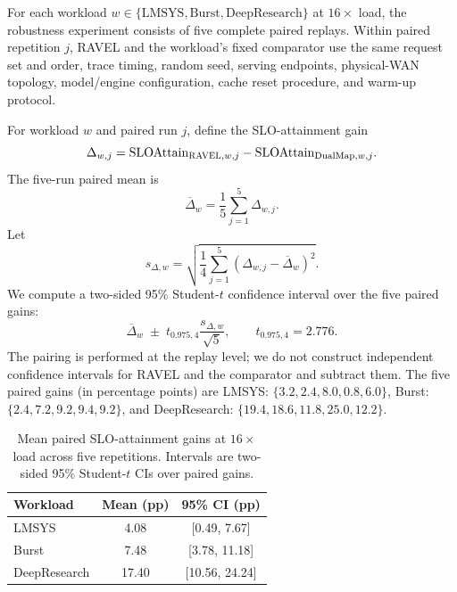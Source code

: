 \documentclass[letterpaper,twocolumn,10pt]{article}
\begin{document}
For each workload
$w\in\{\mathrm{LMSYS},\mathrm{Burst},\mathrm{DeepResearch}\}$ at
$16\times$ load, the robustness experiment consists of five complete paired
replays.  Within paired repetition $j$, RAVEL and the workload's fixed
comparator use the same request set and order, trace timing, random seed,
serving endpoints, physical-WAN topology, model/engine configuration, cache
reset procedure, and warm-up protocol.

For workload $w$ and paired run $j$, define the SLO-attainment gain
\begin{equation}
    \Delta_{w,j}
    =
    \mathrm{SLOAttain}_{\textsc{RAVEL},w,j}
    -
    \mathrm{SLOAttain}_{\mathrm{DualMap},w,j}.
    \label{eq:appendix:paired-gain}
\end{equation}
The five-run paired mean is
\begin{equation}
    \overline{\Delta}_w
    =
    \frac{1}{5}
    \sum_{j=1}^{5}
    \Delta_{w,j}.
    \label{eq:appendix:mean-paired-gain}
\end{equation}
Let
\begin{equation}
    s_{\Delta,w}
    =
    \sqrt{
        \frac{1}{4}
        \sum_{j=1}^{5}
        \left(
            \Delta_{w,j}-\overline{\Delta}_w
        \right)^2
    }.
    \label{eq:appendix:paired-std}
\end{equation}
We compute a two-sided 95\% Student-$t$ confidence interval over the five
paired gains:
\begin{equation}
    \overline{\Delta}_w
    \;\pm\;
    t_{0.975,4}
    \frac{s_{\Delta,w}}{\sqrt{5}},
    \qquad
    t_{0.975,4}=2.776.
    \label{eq:appendix:paired-ci}
\end{equation}
The pairing is performed at the replay level; we do not construct independent
confidence intervals for RAVEL and the comparator and subtract them.  The five
paired gains (in percentage points) are
LMSYS: $\{3.2,2.4,8.0,0.8,6.0\}$,
Burst: $\{2.4,7.2,9.2,9.4,9.2\}$, and
DeepResearch: $\{19.4,18.6,11.8,25.0,12.2\}$.

\begin{table}[t]
    \centering
    \small
    \caption{Mean paired SLO-attainment gains at $16\times$ load across five
    repetitions.  Intervals are two-sided 95\% Student-$t$ CIs over paired
    gains.}
    \label{tab:appendix:five-run-deltas}
    \begin{tabular}{lcc}
        \toprule
        \textbf{Workload} &
        \textbf{Mean (pp)} &
        \textbf{95\% CI (pp)} \\
        \midrule
        LMSYS        & 4.08  & [0.49, 7.67]   \\
        Burst        & 7.48  & [3.78, 11.18]  \\
        DeepResearch & 17.40 & [10.56, 24.24] \\
        \bottomrule
    \end{tabular}
\end{table}
\end{document}
